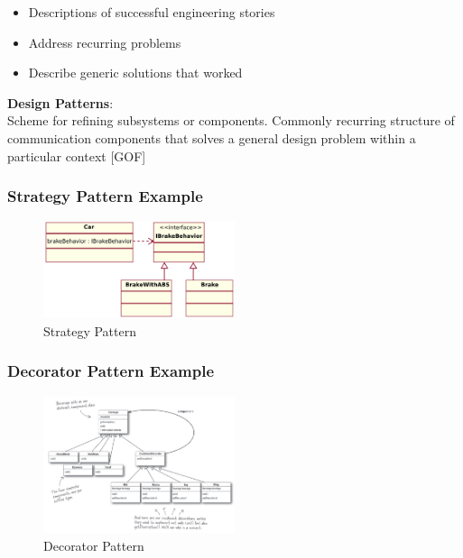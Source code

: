 \begin{itemize}
\tightlist
\item
  Descriptions of successful engineering stories
\item
  Address recurring problems
\item
  Describe generic solutions that worked
\end{itemize}

\textbf{Design Patterns}:\\
Scheme for refining subsystems or components. Commonly recurring
structure of communication components that solves a general design
problem within a particular context {[}GOF{]}

\hypertarget{strategy-pattern-example}{%
\subsubsection{Strategy Pattern
Example}\label{strategy-pattern-example}}

\begin{figure}[H]
\centering
\includegraphics[width=0.5\textwidth]{figures/StrategyPattern_IBrakeBehavior.png}
\caption{Strategy Pattern}
\end{figure}

\hypertarget{decorator-pattern-example}{%
\subsubsection{Decorator Pattern
Example}\label{decorator-pattern-example}}

\begin{figure}[H]
\centering
\includegraphics[width=0.5\textwidth]{figures/decorator_pattern.png}
\caption{Decorator Pattern}
\end{figure}

